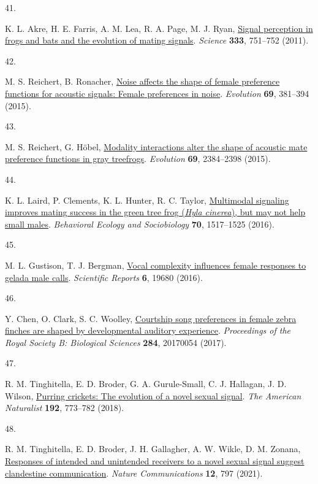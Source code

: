 \documentclass[
]{article}
\newlength{\cslhangindent}
\newlength{\csllabelwidth}
\newenvironment{CSLReferences}[2] %
 {\begin{list}{}{%
  \setlength{\itemindent}{0pt}
  \setlength{\leftmargin}{0pt}
  \setlength{\parsep}{0pt}
  \ifodd #1
   \setlength{\leftmargin}{\cslhangindent}
   \setlength{\itemindent}{-1\cslhangindent}
  \fi
  \setlength{\itemsep}{#2\baselineskip}}}
 {\end{list}}
\newcommand{\CSLLeftMargin}[1]{\parbox[t]{\csllabelwidth}{\strut#1\strut}}
\newcommand{\CSLRightInline}[1]{\parbox[t]{\linewidth - \csllabelwidth}{\strut#1\strut}}
\begin{document}
\begin{CSLReferences}{0}{0}
\CSLLeftMargin{41. }%
\CSLRightInline{K. L. Akre, H. E. Farris, A. M. Lea, R. A. Page, M. J.
Ryan, \href{https://doi.org/10.1126/science.1205623}{Signal perception
in frogs and bats and the evolution of mating signals}. \emph{Science}
\textbf{333}, 751--752 (2011).}

\CSLLeftMargin{42. }%
\CSLRightInline{M. S. Reichert, B. Ronacher,
\href{https://doi.org/10.1111/evo.12592}{Noise affects the shape of
female preference functions for acoustic signals: {Female} preferences
in noise}. \emph{Evolution} \textbf{69}, 381--394 (2015).}

\CSLLeftMargin{43. }%
\CSLRightInline{M. S. Reichert, G. Höbel,
\href{https://doi.org/10.1111/evo.12750}{Modality interactions alter the
shape of acoustic mate preference functions in gray treefrogs}.
\emph{Evolution} \textbf{69}, 2384--2398 (2015).}

\CSLLeftMargin{44. }%
\CSLRightInline{K. L. Laird, P. Clements, K. L. Hunter, R. C. Taylor,
\href{https://doi.org/10.1007/s00265-016-2160-9}{Multimodal signaling
improves mating success in the green tree frog (\emph{{Hyla} cinerea}),
but may not help small males}. \emph{Behavioral Ecology and
Sociobiology} \textbf{70}, 1517--1525 (2016).}

\CSLLeftMargin{45. }%
\CSLRightInline{M. L. Gustison, T. J. Bergman,
\href{https://doi.org/10.1038/srep19680}{Vocal complexity influences
female responses to gelada male calls}. \emph{Scientific Reports}
\textbf{6}, 19680 (2016).}

\CSLLeftMargin{46. }%
\CSLRightInline{Y. Chen, O. Clark, S. C. Woolley,
\href{https://doi.org/10.1098/rspb.2017.0054}{Courtship song preferences
in female zebra finches are shaped by developmental auditory
experience}. \emph{Proceedings of the Royal Society B: Biological
Sciences} \textbf{284}, 20170054 (2017).}

\CSLLeftMargin{47. }%
\CSLRightInline{R. M. Tinghitella, E. D. Broder, G. A. Gurule-Small, C.
J. Hallagan, J. D. Wilson, \href{https://doi.org/10.1086/700116}{Purring
crickets: {The} evolution of a novel sexual signal}. \emph{The American
Naturalist} \textbf{192}, 773--782 (2018).}

\CSLLeftMargin{48. }%
\CSLRightInline{R. M. Tinghitella, E. D. Broder, J. H. Gallagher, A. W.
Wikle, D. M. Zonana,
\href{https://doi.org/10.1038/s41467-021-20971-5}{Responses of intended
and unintended receivers to a novel sexual signal suggest clandestine
communication}. \emph{Nature Communications} \textbf{12}, 797 (2021).}


\end{CSLReferences}
\end{document}
